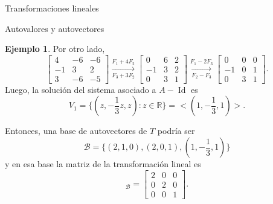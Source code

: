 \documentclass[a4paper,12pt,twoside,spanish,reqno]{amsbook}
\theoremstyle{definition}
\newtheorem{ejemplo}{Ejemplo}[section]
\theoremstyle{remark}
\newcommand{\Id}{\operatorname{Id}}
\newcommand{\R}{\mathbb R}
\begin{document}
\begin{chapter}{Transformaciones lineales}
\begin{section}{Autovalores y autovectores}
\begin{ejemplo}
            Por otro lado, 
            \begin{equation*}
            \begin{bmatrix}4 &-6 &-6\\ -1& 3& 2\\3 &-6& -5 	\end{bmatrix}
            \underset{F_3+3F_2}{\stackrel{F_1+4 F_2}{\longrightarrow}} 
            \begin{bmatrix}0 &6 &2\\ -1& 3& 2\\0 &3& 1 	\end{bmatrix}
            \underset{F_2-F_3}{\stackrel{F_1-2 F_3}{\longrightarrow}}
            \begin{bmatrix}0 &0 &0\\ -1& 0& 1\\0 &3& 1 	\end{bmatrix}.
            \end{equation*}
            Luego,  la solución del sistema asociado a  $A-\Id$ es 
            $$
            V_1 = \{(z,-\frac13z,z): z \in \R\} = <(1,-\frac13,1)>.
            $$
            
            Entonces, una base de autovectores de $T$ podría ser
            $$
            \mathcal{B} = \{(2,1,0),(2,0,1),(1,-\frac13,1) \}
            $$
            y en esa base la matriz de la transformación lineal es
            \begin{equation*}
            [T]_{\mathcal{B}} = \begin{bmatrix}2 &0 &0\\ 0& 2& 0\\0 &0& 1 	\end{bmatrix}.
            \end{equation*}
        \end{ejemplo}
    
        
        \end{section}
    
    
        
    
        
    \end{chapter}
\end{document}

